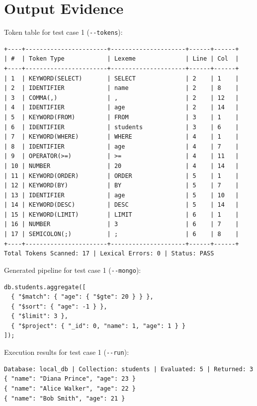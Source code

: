 \documentclass[12pt,a4paper]{report}
\newcommand{\codeus}{\textunderscore\allowbreak}
\DeclareRobustCommand{\code}[1]{\texttt{\let\_\codeus #1}}
\begin{document}
\section{Output Evidence}
Token table for test case 1 (\code{-{}-tokens}):
\begin{Verbatim}[fontsize=\footnotesize]
+----+-----------------------+---------------------+------+------+
| #  | Token Type            | Lexeme              | Line | Col  |
+----+-----------------------+---------------------+------+------+
| 1  | KEYWORD(SELECT)       | SELECT              | 2    | 1    |
| 2  | IDENTIFIER            | name                | 2    | 8    |
| 3  | COMMA(,)              | ,                   | 2    | 12   |
| 4  | IDENTIFIER            | age                 | 2    | 14   |
| 5  | KEYWORD(FROM)         | FROM                | 3    | 1    |
| 6  | IDENTIFIER            | students            | 3    | 6    |
| 7  | KEYWORD(WHERE)        | WHERE               | 4    | 1    |
| 8  | IDENTIFIER            | age                 | 4    | 7    |
| 9  | OPERATOR(>=)          | >=                  | 4    | 11   |
| 10 | NUMBER                | 20                  | 4    | 14   |
| 11 | KEYWORD(ORDER)        | ORDER               | 5    | 1    |
| 12 | KEYWORD(BY)           | BY                  | 5    | 7    |
| 13 | IDENTIFIER            | age                 | 5    | 10   |
| 14 | KEYWORD(DESC)         | DESC                | 5    | 14   |
| 15 | KEYWORD(LIMIT)        | LIMIT               | 6    | 1    |
| 16 | NUMBER                | 3                   | 6    | 7    |
| 17 | SEMICOLON(;)          | ;                   | 6    | 8    |
+----+-----------------------+---------------------+------+------+
Total Tokens Scanned: 17 | Lexical Errors: 0 | Status: PASS
\end{Verbatim}

Generated pipeline for test case 1 (\code{-{}-mongo}):
\begin{lstlisting}
db.students.aggregate([
  { "$match": { "age": { "$gte": 20 } } },
  { "$sort": { "age": -1 } },
  { "$limit": 3 },
  { "$project": { "_id": 0, "name": 1, "age": 1 } }
]);
\end{lstlisting}
Execution results for test case 1 (\code{-{}-run}):
\begin{Verbatim}[fontsize=\footnotesize]
Database: local_db | Collection: students | Evaluated: 5 | Returned: 3
{ "name": "Diana Prince", "age": 23 }
{ "name": "Alice Walker", "age": 22 }
{ "name": "Bob Smith", "age": 21 }
\end{Verbatim}
\end{document}
